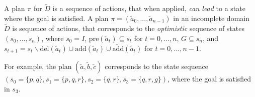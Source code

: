 \documentclass[letterpaper]{article}
\begin{document}
A plan $\pi$ for $\tilde{D}$ is a sequence of actions, that when applied, {\em can lead} to a state where the goal is satisfied.  A plan $\pi = (\tilde{a}_0, ..., \tilde{a}_{n-1})$ in an incomplete domain $\tilde{D}$ is sequence of actions, that corresponds to the {\em optimistic} sequence of states $(s_0, ..., s_n)$, where $s_0 = I$, $\text{pre}(\tilde{a}_t) \subseteq s_t$ for $t = 0,..., n$, $G \subseteq s_n$, and $s_{t+1} = s_t \backslash \text{del}(\tilde{a}_t) \cup \text{add}(\tilde{a}_t) \cup \widetilde{\text{add}}(\tilde{a}_t)$ for $t = 0,..., n-1$.  

For example, the plan $(\tilde{a}, \tilde{b}, \tilde{c})$ corresponds to the state sequence $(s_0 = \{p, q\}, s_1 = \{p, q, r\}, s_2 = \{q, r\}, s_3 = \{q, r, g\})$, where the goal is satisfied in $s_3$.  

%
%
%
\end{document}
